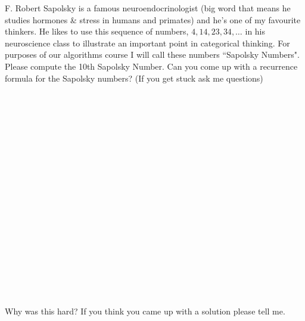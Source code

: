 \documentclass[12pt]{article}
\begin{document}
\noindent F. Robert Sapolsky is a famous neuroendocrinologist (big word that means he studies hormones \& stress in humans and primates) and he's one of my favourite thinkers. He likes to use this sequence of numbers, $4, 14, 23, 34, \dots$ in his neuroscience class to illustrate an important point in categorical thinking. For purposes of our algorithms course I will call these numbers ``Sapolsky Numbers". Please compute the 10th Sapolsky Number. Can you come up with a recurrence formula for the Sapolsky numbers? (If you get stuck ask me questions)\\\\\\\\\\\\\\\\\\\\\\\\\\\\\\\\\\\\\\\\
Why was this hard? If you think you came up with a solution please tell me. 
\end{document}
